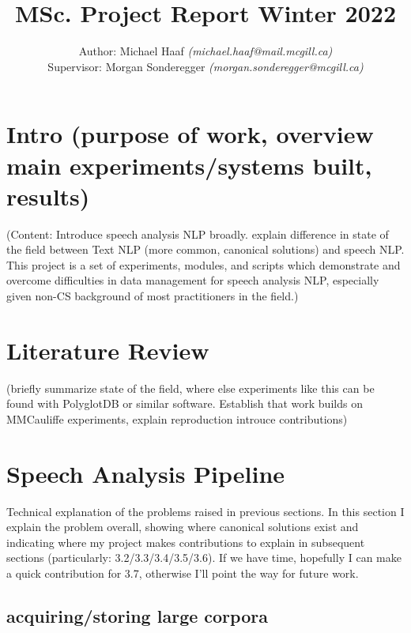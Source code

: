 \documentclass[twoside,11pt]{article}
\begin{document}
\title{MSc. Project Report Winter 2022}
\author{Author: Michael Haaf \textit{(michael.haaf@mail.mcgill.ca)} \\ Supervisor: Morgan Sonderegger \textit{(morgan.sonderegger@mcgill.ca)}}

\maketitle


\section{Intro (purpose of work, overview main experiments/systems built, results)}

(Content: Introduce speech analysis NLP broadly. explain difference in state of the field between Text NLP (more common, canonical solutions) and speech NLP. This project is a set of experiments, modules, and scripts which demonstrate and overcome difficulties in data management for speech analysis NLP, especially given non-CS background of most practitioners in the field.)


\section{Literature Review}

(briefly summarize state of the field, where else experiments like this can be found with PolyglotDB or similar software. Establish that work builds on MMCauliffe experiments, explain reproduction introuce contributions)

\section{Speech Analysis Pipeline}

Technical explanation of the problems raised in previous sections. In this section I explain the problem overall, showing where canonical solutions exist and indicating where my project makes contributions to explain in subsequent sections (particularly: 3.2/3.3/3.4/3.5/3.6). If we have time, hopefully I can make a quick contribution for 3.7, otherwise I'll point the way for future work.


\subsection{acquiring/storing large corpora}
\end{document}
